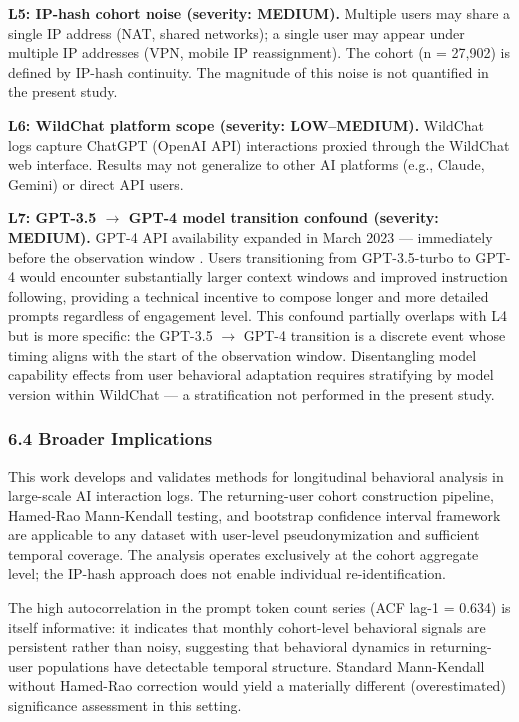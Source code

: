 \textbf{L5: IP-hash cohort noise (severity: MEDIUM).} Multiple users may share a single IP address (NAT, shared networks); a single user may appear under multiple IP addresses (VPN, mobile IP reassignment). The cohort (n = 27,902) is defined by IP-hash continuity. The magnitude of this noise is not quantified in the present study.

\textbf{L6: WildChat platform scope (severity: LOW--MEDIUM).} WildChat logs capture ChatGPT (OpenAI API) interactions proxied through the WildChat web interface. Results may not generalize to other AI platforms (e.g., Claude, Gemini) or direct API users.

\textbf{L7: GPT-3.5 $\rightarrow$ GPT-4 model transition confound (severity: MEDIUM).} GPT-4 API availability expanded in March 2023 --- immediately before the observation window \citep{April2023}. Users transitioning from GPT-3.5-turbo to GPT-4 would encounter substantially larger context windows and improved instruction following, providing a technical incentive to compose longer and more detailed prompts regardless of engagement level. This confound partially overlaps with L4 but is more specific: the GPT-3.5 $\rightarrow$ GPT-4 transition is a discrete event whose timing aligns with the start of the observation window. Disentangling model capability effects from user behavioral adaptation requires stratifying by model version within WildChat --- a stratification not performed in the present study.

\subsubsection{6.4 Broader Implications}

This work develops and validates methods for longitudinal behavioral analysis in large-scale AI interaction logs. The returning-user cohort construction pipeline, Hamed-Rao Mann-Kendall testing, and bootstrap confidence interval framework are applicable to any dataset with user-level pseudonymization and sufficient temporal coverage. The analysis operates exclusively at the cohort aggregate level; the IP-hash approach does not enable individual re-identification.

The high autocorrelation in the prompt token count series (ACF lag-1 = 0.634) is itself informative: it indicates that monthly cohort-level behavioral signals are persistent rather than noisy, suggesting that behavioral dynamics in returning-user populations have detectable temporal structure. Standard Mann-Kendall without Hamed-Rao correction would yield a materially different (overestimated) significance assessment in this setting.

